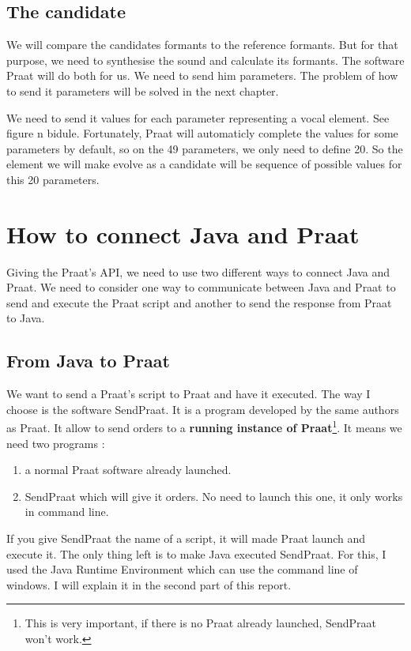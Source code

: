 \documentclass[12pt]{report}
\begin{document}
\section{The candidate}
We will compare the candidates formants to the reference formants. But for that purpose, we need to synthesise the sound and calculate its formants. The software Praat will do both for us. We need to send him parameters. The problem of how to send it parameters will be solved in the next chapter.

We need to send it values for each parameter representing a vocal element. See figure n bidule. Fortunately, Praat will automaticly complete the values for some parameters by default, so on the 49 parameters, we only need to define 20. So the element we will make evolve as a candidate will be sequence of possible values for this 20 parameters.


\chapter{How to connect Java and Praat}
Giving the Praat's API, we need to use two different ways to connect Java and Praat.
We need to consider one way to communicate between Java and Praat to send and execute the Praat script and another to send the response from Praat to Java.

\section{From Java to Praat}
We want to send a Praat's script to Praat and have it executed. The way I choose is the software SendPraat\cite{ref}. It is a program developed by the same authors as Praat. It allow to send orders to a {\bfseries running instance of Praat}\footnote{This is very important, if there is no Praat already launched, SendPraat won't work.}.
It means we need two programs :

\begin{enumerate}
\item a normal Praat software already launched.
\item SendPraat which will give it orders. No need to launch this one, it only works in command line.
\end{enumerate}

If you give SendPraat the name of a script, it will made Praat launch and execute it. The only thing left is to make Java executed SendPraat. For this, I used the Java Runtime Environment which can use the command line of windows. I will explain it in the second part of this report.
\end{document}
